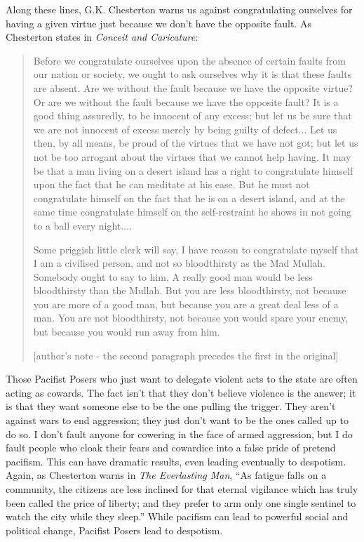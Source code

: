 Along these lines, G.K. Chesterton warns us against congratulating
ourselves for having a given virtue just because we don’t have the
opposite fault. As Chesterton states in \textit{Conceit and
Caricature}:

\begin{quote}
Before we congratulate ourselves upon the absence of certain faults from
our nation or society, we ought to ask ourselves why it is that these
faults are absent. Are we without the fault because we have the
opposite virtue? Or are we without the fault because we have the
opposite fault? It is a good thing assuredly, to be innocent of any
excess; but let us be sure that we are not innocent of excess merely by
being guilty of defect... Let us then, by all means, be proud of the
virtues that we have not got; but let us not be too arrogant about the
virtues that we cannot help having. It may be that a man living on a
desert island has a right to congratulate himself upon the fact that he
can meditate at his ease. But he must not congratulate himself on the
fact that he is on a desert island, and at the same time congratulate
himself on the self-restraint he shows in not going to a ball every
night....

Some priggish little clerk will say, {\textquotedbl}I have reason to
congratulate myself that I am a civilised person, and not so
bloodthirsty as the Mad Mullah.{\textquotedbl} Somebody ought to say to
him, {\textquotedbl}A really good man would be less bloodthirsty than
the Mullah. But you are less bloodthirsty, not because you are more of
a good man, but because you are a great deal less of a man. You are not
bloodthirsty, not because you would spare your enemy, but because you
would run away from him.{\textquotedbl} 

[author’s note - the second paragraph precedes the first in the
original]
\end{quote}

Those Pacifist Posers who just want to delegate violent acts to the
state are often acting as cowards. The fact isn’t that they don’t
believe violence is the answer; it is that they want someone else to be
the one pulling the trigger. They aren’t against wars to end
aggression; they just don’t want to be the ones called up to do so. I
don’t fault anyone for cowering in the face of armed aggression, but I
do fault people who cloak their fears and cowardice into a false pride
of pretend pacifism. This can have dramatic results, even leading
eventually to despotism. Again, as Chesterton warns in \textit{The
Everlasting Man}, “As fatigue falls on a community, the citizens are
less inclined for that eternal vigilance which has truly been called
the price of liberty; and they prefer to arm only one single sentinel
to watch the city while they sleep.”  While pacifism can lead to
powerful social and political change, Pacifist Posers lead to
despotism.

